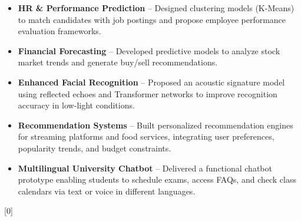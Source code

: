 \documentclass[a4paper,11pt]{article}
\begin{document}
\begin{itemize}[leftmargin=1.2em]
\setlength{\itemsep}{-5pt}
  \item \textbf{HR \& Performance Prediction} -- Designed clustering models (K-Means) to match candidates with job postings and propose employee performance evaluation frameworks.
  
  \item \textbf{Financial Forecasting} -- Developed predictive models to analyze stock market trends and generate buy/sell recommendations.
  
  \item \textbf{Enhanced Facial Recognition} -- Proposed an acoustic signature model using reflected echoes and Transformer networks to improve recognition accuracy in low-light conditions.
  
  \item \textbf{Recommendation Systems} -- Built personalized recommendation engines for streaming platforms and food services, integrating user preferences, popularity trends, and budget constraints.
  
  \item \textbf{Multilingual University Chatbot} -- Delivered a functional chatbot prototype enabling students to schedule exams, access FAQs, and check class calendars via text or voice in different languages.\\
\end{itemize}
\cvsection{}[0]
\end{document}
